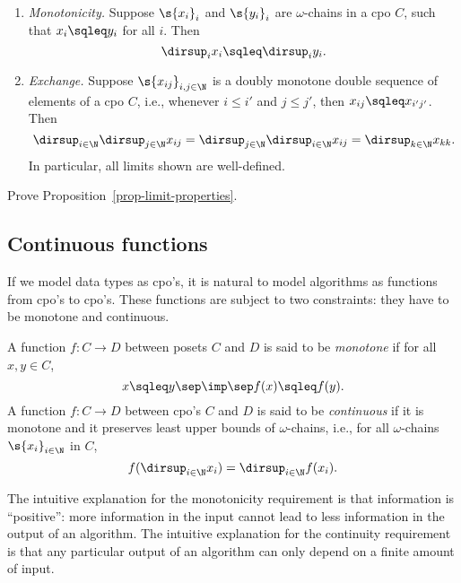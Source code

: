 \documentclass[12pt]{article}
\begin{document}
\begin{proposition}\label{prop-limit-properties}
  \begin{enumerate}
  \item {\em Monotonicity.}  Suppose $\s{x_i}_i$ and $\s{y_i}_i$ are
    $\omega$-chains in a cpo $C$, such that $x_i\sqleq y_i$ for all
    $i$. Then
    \[ \dirsup_i x_i \sqleq\dirsup_i y_i.
    \]
  \item {\em Exchange.} Suppose $\s{x_{ij}}_{i,j\in\N}$ is a doubly
    monotone double sequence of elements of a cpo $C$, i.e., whenever
    $i\leq i'$ and $j\leq j'$, then $x_{ij}\sqleq x_{i'j'}$. Then
    \[ \dirsup_{i\in\N}\dirsup_{j\in\N} x_{ij} = 
    \dirsup_{j\in\N}\dirsup_{i\in\N} x_{ij} =
    \dirsup_{k\in\N} x_{kk}.
    \]
    In particular, all limits shown are well-defined.
  \end{enumerate}
\end{proposition}

\begin{exercise}
  Prove Proposition~\ref{prop-limit-properties}.
\end{exercise}

\subsection{Continuous functions}

If we model data types as cpo's, it is natural to model algorithms as
functions from cpo's to cpo's. These functions are subject to two
constraints: they have to be monotone and continuous.

\begin{definition}
  A function $f:C\to D$ between posets $C$ and $D$ is said to be {\em
    monotone} if for all $x,y\in C$, 
  \[ x\sqleq y \sep\imp\sep f(x)\sqleq f(y).
  \]
  A function $f:C\to D$ between cpo's $C$ and $D$ is said to be {\em
    continuous} if it is monotone and it preserves least upper bounds
  of $\omega$-chains, i.e., for all $\omega$-chains $\s{x_i}_{i\in\N}$
  in $C$,
  \[ f(\dirsup_{i\in\N}x_i) = \dirsup_{i\in\N}f(x_i).
  \]
\end{definition}

The intuitive explanation for the monotonicity requirement is that
information is ``positive'': more information in the input cannot lead
to less information in the output of an algorithm. The intuitive
explanation for the continuity requirement is that any particular
output of an algorithm can only depend on a finite amount of input.
\end{document}
